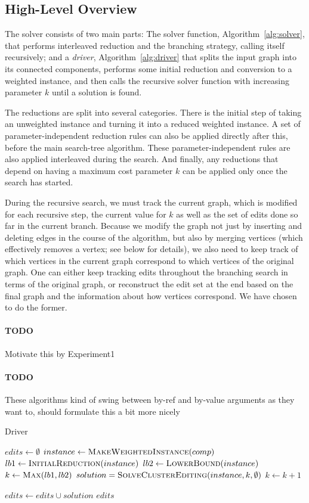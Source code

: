 \documentclass{article}
\newcommand{\todo}[1]{\paragraph{TODO} #1}
\begin{document}
\subsection{High-Level Overview}

The solver consists of two main parts: The solver function, Algorithm~\ref{alg:solver}, that
performs interleaved reduction and the branching strategy, calling itself recursively; and a
\emph{driver}, Algorithm~\ref{alg:driver} that splits the input graph into its connected components,
performs some initial reduction and conversion to a weighted instance, and then calls the recursive
solver function with increasing parameter $k$ until a solution is found. 

The reductions are split into several categories. There is the initial step of taking an
unweighted instance and turning it into a reduced weighted instance. A set of parameter-independent
reduction rules can also be applied directly after this, before the main search-tree algorithm.
These parameter-independent rules are also applied interleaved during the search. And finally, any
reductions that depend on having a maximum cost parameter $k$ can be applied only once the search
has started.

During the recursive search, we must track the current graph, which is modified for each recursive
step, the current value for $k$ as well as the set of edits done so far in the current branch.
Because we modify the graph not just by inserting and deleting edges in the course of the algorithm,
but also by merging vertices (which effectively removes a vertex; see below for details), we also
need to keep track of which vertices in the current graph correspond to which vertices of the
original graph. One can either keep tracking edits throughout the branching search in terms of the
original graph, or reconstruct the edit set at the end based on the final graph and the information
about how vertices correspond. We have chosen to do the former.
\todo Motivate this by Experiment1

\todo These algorithms kind of swing between by-ref and by-value arguments as they want to, should
formulate this a bit more nicely

\begin{algorithm}{Driver}
\caption{Driver}
\label{alg:driver}
\begin{algorithmic}

	\State $edits \gets \emptyset$
		\State $instance \gets \Call{MakeWeightedInstance}{comp}$
		\State $lb1 \gets \Call{InitialReduction}{instance}$
		\State $lb2 \gets \Call{LowerBound}{instance}$
		\State $k \gets \Call{Max}{lb1, lb2}$
		\Repeat
			\State $solution = \Call{SolveClusterEditing}{instance, k, \emptyset}$
			\State $k \gets k + 1$

		\State $edits \gets edits \cup solution$
	\EndFor
	\State \Return $edits$
\EndFunction

\end{algorithmic}
\end{algorithm}
\end{document}
